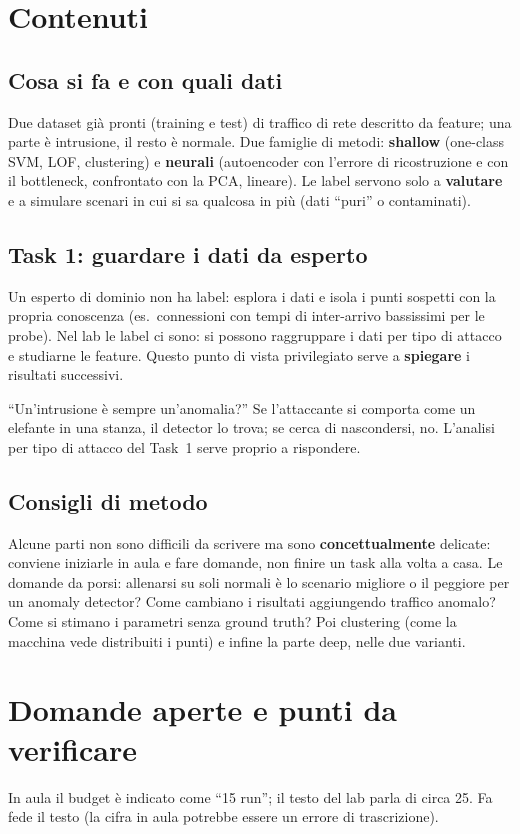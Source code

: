 \section{Contenuti}

\subsection{Cosa si fa e con quali dati}
Due dataset già pronti (training e test) di traffico di rete descritto da feature; una parte è intrusione, il
resto è normale. Due famiglie di metodi: \textbf{shallow} (one-class SVM, LOF, clustering) e \textbf{neurali}
(autoencoder con l'errore di ricostruzione e con il bottleneck, confrontato con la PCA, lineare). Le label
servono solo a \textbf{valutare} e a simulare scenari in cui si sa qualcosa in più (dati ``puri'' o
contaminati).

\subsection{Task 1: guardare i dati da esperto}
Un esperto di dominio non ha label: esplora i dati e isola i punti sospetti con la propria conoscenza (es.\
connessioni con tempi di inter-arrivo bassissimi per le probe). Nel lab le label ci sono: si possono
raggruppare i dati per tipo di attacco e studiarne le feature. Questo punto di vista privilegiato serve a
\textbf{spiegare} i risultati successivi.

\begin{esame}
``Un'intrusione è sempre un'anomalia?'' Se l'attaccante si comporta come un elefante in una stanza, il
detector lo trova; se cerca di nascondersi, no. L'analisi per tipo di attacco del Task~1 serve proprio a
rispondere.
\end{esame}

\subsection{Consigli di metodo}
Alcune parti non sono difficili da scrivere ma sono \textbf{concettualmente} delicate: conviene iniziarle in
aula e fare domande, non finire un task alla volta a casa. Le domande da porsi: allenarsi su soli normali è lo
scenario migliore o il peggiore per un anomaly detector? Come cambiano i risultati aggiungendo traffico
anomalo? Come si stimano i parametri senza ground truth? Poi clustering (come la macchina vede distribuiti i
punti) e infine la parte deep, nelle due varianti.

\section{Domande aperte e punti da verificare}
\begin{verifica}
In aula il budget è indicato come ``15 run''; il testo del lab parla di circa 25. Fa fede il testo (la cifra
in aula potrebbe essere un errore di trascrizione).
\end{verifica}

